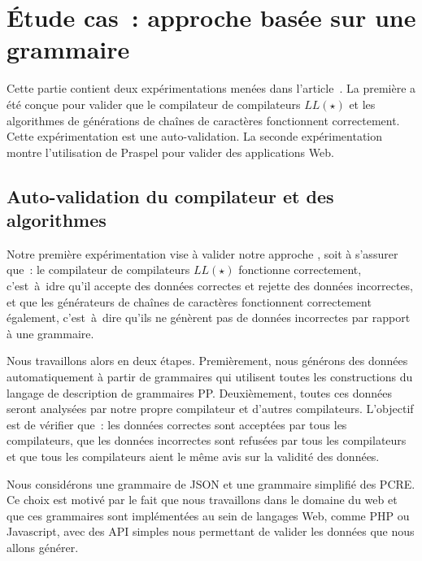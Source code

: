 \section{Étude cas~: approche basée sur une grammaire}
\label{section:experimentation:grammar}

Cette partie contient deux expérimentations menées dans
l'article~. La première a été conçue pour valider que le
compilateur de compilateurs $LL(\star)$ et les algorithmes de générations de
chaînes de caractères fonctionnent correctement. Cette expérimentation est une
auto-validation. La seconde expérimentation montre l'utilisation de Praspel pour
valider des applications Web.

\subsection{Auto-validation du compilateur et des algorithmes}

Notre première expérimentation vise à valider notre approche
, soit à s'assurer que~: le compilateur de
compilateurs $LL(\star)$ fonctionne correctement, c'est~à~idre qu'il accepte des
données correctes et rejette des données incorrectes, et que les générateurs de
chaînes de caractères fonctionnent correctement également, c'est~à~dire qu'ils
ne génèrent pas de données incorrectes par rapport à une grammaire.

Nous travaillons alors en deux étapes. Premièrement, nous générons des données
automatiquement à partir de grammaires qui utilisent toutes les constructions du
langage de description de grammaires PP. Deuxièmement, toutes ces données seront
analysées par notre propre compilateur et d'autres compilateurs. L'objectif est
de vérifier que~: les données correctes sont acceptées par tous les
compilateurs, que les données incorrectes sont refusées par tous les
compilateurs et que tous les compilateurs aient le même avis sur la validité des
données.

Nous considérons une grammaire de JSON et une grammaire simplifié des PCRE. Ce
choix est motivé par le fait que nous travaillons dans le domaine du web et que
ces grammaires sont implémentées au sein de langages Web, comme PHP ou
Javascript, avec des API simples nous permettant de valider les données que nous
allons générer.

